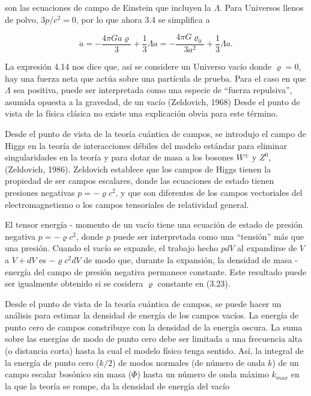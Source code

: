 \documentclass[11pt]{article}
\begin{document}
{    son las ecuaciones de campo de Einstein que incluyen la $\Lambda$. Para Universos llenos de polvo, $3p/c^2=0$, por lo que ahora 3.4  se simplifica a 
    
    
    \begin{equation}
         \ddot{a} = - \frac{4 \pi G a \varrho  }{3}+ \frac{1}{3} \Lambda a =- \frac{4 \pi G\varrho_0 }{3a^2}+ \frac{1}{3} \Lambda a. 
    \end{equation}
    
    La expresión 4.14 nos dice que, así se considere un Universo vacío donde $\varrho=0$, hay una fuerza neta que actúa sobre una partícula de prueba. Para el caso en que $\Lambda$ sea positiva, puede ser interpretada como una especie de ``fuerza repulsiva'', asumida opuesta a la gravedad, de un vacío (Zeldovich, 1968) Desde el punto de vista de la física clásica no existe una explicación obvia para este término. 
    
    Desde el punto de vista de la teoría cuántica de campos, se introdujo el campo de Higgs en la teoría de interacciones débiles del modelo estándar para eliminar singularidades en la teoría y para dotar de masa a los bosones $W^{\pm}$ y $Z^0$,  (Zeldovich, 1986).  Zeldovich establece que los campos de Higgs tienen la propiedad de ser campos escalares, donde las ecuaciones de estado tienen presiones negativas $p=- \varrho c^2$, y que son diferentes de los campos vectoriales del electromagnetismo o los campos tensoriales de relatividad general. 
    
    El tensor energía - momento de un vacío tiene una ecuación de estado de presión negativa $p=- \varrho c^2$, donde $p$ puede ser interpretada como una ``tensión'' más que una presión. Cuando el vacío se expande, el trabajo hecho $p dV$  al expandirse de $V$ a $V + dV$ es $- \varrho c^2 dV$ de modo que, durante la expansión, la densidad de masa - energía del campo de presión negativa permanece constante. Este resultado puede ser igualmente obtenido si se cosidera $\varrho$ constante en (3.23). 
    
    Desde el punto de vista de la teoría cuántica de campos, se puede hacer un análisis para estimar la densidad de energía de los campos vacíos. La energía de punto cero de campos constribuye con la densidad de la energía oscura. La suma sobre las energías de modo de punto cero debe ser limitada a una frecuencia alta (o distancia corta) hasta la cual el modelo físico tenga sentido. Así, la integral de la energía de punto cero ($k/2$) de modos normales (de número de onda $k$) de un campo escalar bosónico sin masa ($\Phi$) hasta un número de onda máximo $k_{max}$ en la que la teoría se rompe, da la densidad de energía del vacío 
    
}
\end{document}

